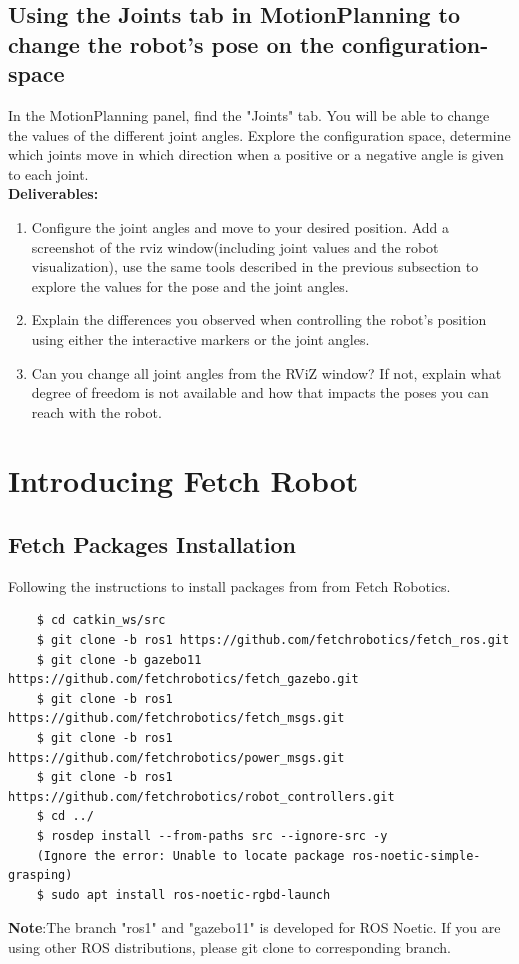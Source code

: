 \documentclass[12pt]{article}
\begin{document}
\subsection{Using the Joints tab in MotionPlanning to change the robot’s pose on the configuration-space}

In the MotionPlanning panel, find the "Joints" tab. You will be able to change the values of the different joint angles. Explore the configuration space, determine which joints move in which direction when a positive or a negative angle is given to each joint.
\\

\textbf{Deliverables:}
\begin{enumerate}
    \item Configure the joint angles and move to your desired position. Add a screenshot of the rviz window(including joint values and the robot visualization), use the same tools described in the previous subsection to explore the values for the pose and the joint angles.
    
    \item Explain the differences you observed when controlling the robot’s position using either the interactive markers or the joint angles.
    
    \item Can you change all joint angles from the RViZ window? If not, explain what degree of freedom is not available and how that impacts the poses you can reach with the robot.
\end{enumerate}


\section{Introducing Fetch Robot}
\subsection{Fetch Packages Installation}
Following the instructions to install packages from from Fetch Robotics.
\begin{verbatim}
    $ cd catkin_ws/src
    $ git clone -b ros1 https://github.com/fetchrobotics/fetch_ros.git
    $ git clone -b gazebo11 https://github.com/fetchrobotics/fetch_gazebo.git
    $ git clone -b ros1 https://github.com/fetchrobotics/fetch_msgs.git
    $ git clone -b ros1 https://github.com/fetchrobotics/power_msgs.git
    $ git clone -b ros1 https://github.com/fetchrobotics/robot_controllers.git
    $ cd ../
    $ rosdep install --from-paths src --ignore-src -y
    (Ignore the error: Unable to locate package ros-noetic-simple-grasping)
    $ sudo apt install ros-noetic-rgbd-launch
    \end{verbatim}
\textbf{Note}:The branch "ros1" and "gazebo11" is developed for ROS Noetic. If you are using other ROS distributions, please git clone to corresponding branch.
\end{document}
